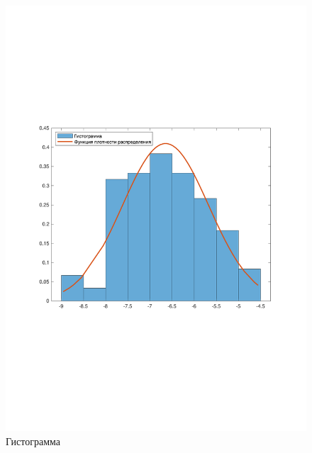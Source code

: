 \begin{figure}[H]
    \centering
    \includegraphics[trim=0.5cm 9cm 0.5cm 8cm]{img/histogram.pdf}
    \caption{Гистограмма}
\end{figure}

